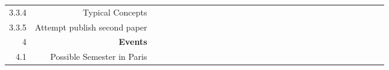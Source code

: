 \begin{table}[!ht]
{\begin{tabular}{rrllllllllllllllllllllll}
            3.3.4 & Typical Concepts               & ~   & ~   & ~     & ~     & ~   & ~    & ~    & ~      & ~    & ~   & ~   \\
            3.3.5 & Attempt publish second paper   & ~   & ~   & ~     & ~     & ~   & ~    & ~    & ~      & ~    & ~   & ~   \\
            4     & \textbf{Events}                & ~   & ~   & ~     & ~     & ~   & ~    & ~    & ~      & ~    & ~   & ~   \\
            4.1   & Possible Semester in Paris     & ~   & ~   & ~     & ~     & ~   & ~    & ~    & ~      & ~    & ~   & ~   \\
        \end{tabular} }
\end{table}